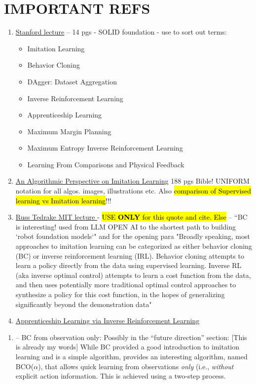 \documentclass{article}
\newcommand{\hlc}[2][purple!10]{{\colorlet{foo}{#1} \sethlcolor{foo}\hl{#2}}}
\begin{document}
\section{IMPORTANT REFS}
\begin{enumerate}
	\item \href{https://web.stanford.edu/class/cs237b/pdfs/lecture/cs237b_lecture_12.pdf}{Stanford lecture} -- 14 pgs - SOLID foundation - use to sort out terms:
	\begin{itemize}
		\item Imitation Learning
		\item Behavior Cloning
		\item DAgger: Dataset Aggregation
		\item Inverse Reinforcement Learning  
		\item Apprenticeship Learning 
		\item Maximum Margin Planning
		\item Maximum Entropy Inverse Reinforcement Learning
		\item Learning From Comparisons and Physical Feedback
	\end{itemize}
	\item \cite{Osa-2018} \href{https://arxiv.org/pdf/1811.06711}{An Algorithmic Perspective on Imitation Learning} 188 pgs Bible! UNIFORM notation for all algos. images, illustrations etc. Also \hlc{comparison of Supervised learning vs Imitation learning}!!!
	\item \href{https://underactuated.mit.edu/imitation.html#:~:text=Broadly%20speaking%2C%20most%20approaches%20to,the%20data%20using%20supervised%20learning.}{Russ Tedrake MIT lecture \citep{TedrakeLecture2023}} - \hlc{USE \textbf{ONLY} for this quote and cite. Else } -- ``BC is interesting! used from LLM OPEN AI to the shortest path to building `robot foundation models`"  and for the opening para "Broadly speaking, most approaches to imitation learning can be categorized as either behavior cloning (BC) or inverse reinforcement learning (IRL). Behavior cloning attempts to learn a policy directly from the data using supervised learning. Inverse RL (aka inverse optimal control) attempts to learn a cost function from the data, and then uses potentially more traditional optimal control approaches to synthesize a policy for this cost function, in the hopes of generalizing significantly beyond the demonstration data"
	\item \href{https://ai.stanford.edu/~ang/papers/icml04-apprentice.pdf}{Apprenticeship Learning via Inverse Reinforcement Learning}
\end{enumerate}
\begin{enumerate}
	\item \cite{torabi2018BCO} -- BC from observation only: Possibly in the ``future direction'' section: [This is already my words] While BC provided a good introduction to imitation learning and is a simple algorithm, \cite{torabi2018BCO} provides an interesting algorithm, named BCO($\alpha$), that allows quick learning from observations \textit{only} (i.e., \textit{without} explicit action information. This is achieved using a two-step process.
\end{enumerate}
\end{document}
